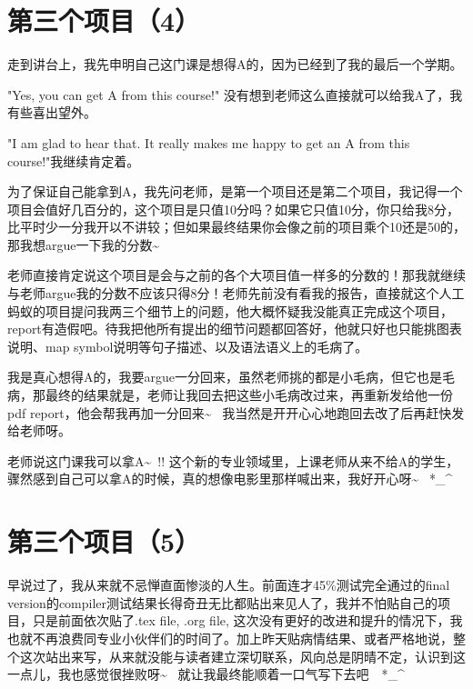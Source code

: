 \documentclass[12pt]{book}
\begin{document}
\section{第三个项目（4）}
\label{sec-32-4}

走到讲台上，我先申明自己这门课是想得A的，因为已经到了我的最后一个学期。

"Yes, you can get A from this course!" 没有想到老师这么直接就可以给我A了，我有些喜出望外。

"I am glad to hear that. It really makes me happy to get an A from this course!"我继续肯定着。

为了保证自己能拿到A，我先问老师，是第一个项目还是第二个项目，我记得一个项目会值好几百分的，这个项目是只值10分吗？如果它只值10分，你只给我8分，比平时少一分我开以不讲较；但如果最终结果你会像之前的项目乘个10还是50的，那我想argue一下我的分数\textasciitilde{}~

老师直接肯定说这个项目是会与之前的各个大项目值一样多的分数的！那我就继续与老师argue我的分数不应该只得8分！老师先前没有看我的报告，直接就这个人工蚂蚁的项目提问我两三个细节上的问题，他大概怀疑我没能真正完成这个项目，report有造假吧。待我把他所有提出的细节问题都回答好，他就只好也只能挑图表说明、map symbol说明等句子描述、以及语法语义上的毛病了。

我是真心想得A的，我要argue一分回来，虽然老师挑的都是小毛病，但它也是毛病，那最终的结果就是，老师让我回去把这些小毛病改过来，再重新发给他一份pdf report，他会帮我再加一分回来\textasciitilde{}~ 我当然是开开心心地跑回去改了后再赶快发给老师呀。

老师说这门课我可以拿A\textasciitilde{}~!! 这个新的专业领域里，上课老师从来不给A的学生，骤然感到自己可以拿A的时候，真的想像电影里那样喊出来，我好开心呀\textasciitilde{}~ *\_\^{}

\section{第三个项目（5）}
\label{sec-32-5}

早说过了，我从来就不忌惮直面惨淡的人生。前面连才45\%测试完全通过的final version的compiler测试结果长得奇丑无比都贴出来见人了，我并不怕贴自己的项目，只是前面依次贴了.tex file, .org file, 这次没有更好的改进和提升的情况下，我也就不再浪费同专业小伙伴们的时间了。加上昨天贴病情结果、或者严格地说，整个这次站出来写，从来就没能与读者建立深切联系，风向总是阴晴不定，认识到这一点儿，我也感觉很挫败呀\textasciitilde{}~ 就让我最终能顺着一口气写下去吧　*\_\^{}
\end{document}
